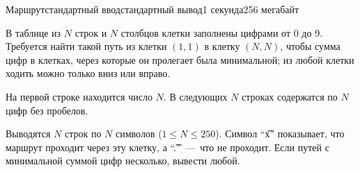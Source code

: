 \begin{problem}{Маршрут}{стандартный ввод}{стандартный вывод}{1 секунда}{256 мегабайт}

В таблице из $N$ строк и $N$ столбцов клетки заполнены цифрами от 0 до 9. Требуется найти такой путь из клетки $(1, 1)$ в клетку $(N, N)$, чтобы сумма цифр в клетках, через которые он пролегает была минимальной; из любой клетки ходить можно только вниз или вправо.

\InputFile
На первой строке находится число $N$. В следующих $N$ строках содержатся по $N$ цифр без пробелов.

\OutputFile
Выводятся $N$ строк по $N$ символов ($1 \le N \le 250$). Символ ``\t{x}'' показывает, что маршрут проходит через эту клетку, а ``\t{.}''~---~что не проходит. Если путей с минимальной суммой цифр несколько, вывести любой.

\Example

\begin{example}
%
\end{example}

\end{problem}

